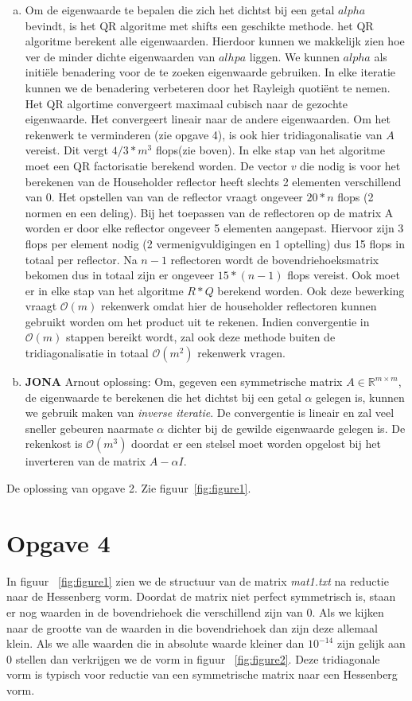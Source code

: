 \documentclass[a4paper]{article}
\newcommand{\opgave}[1]{\section*{Opgave #1}}
\begin{document}
\begin{enumerate}[a)]
\item
Om de eigenwaarde te bepalen die zich het dichtst bij een getal $alpha$ bevindt, is het QR algoritme met shifts een geschikte methode. het QR algoritme berekent alle eigenwaarden. Hierdoor kunnen we makkelijk zien hoe ver de minder dichte eigenwaarden van $alhpa$ liggen. We kunnen $alpha$ als initi\"ele benadering voor de te zoeken eigenwaarde gebruiken. In elke iteratie kunnen we de benadering verbeteren door het Rayleigh quoti\"ent te nemen. Het QR algortime convergeert maximaal cubisch naar de gezochte eigenwaarde. Het convergeert lineair naar de andere eigenwaarden. Om het rekenwerk te verminderen (zie opgave 4), is ook hier tridiagonalisatie van $A$ vereist. Dit vergt $4/3*m^3$ flops(zie boven). In elke stap van het algoritme moet een QR factorisatie berekend worden. De vector $v$ die nodig is voor het berekenen van de Householder reflector heeft slechts 2 elementen verschillend van 0. Het opstellen van van de reflector vraagt ongeveer $20*n$ flops (2 normen en een deling). Bij het toepassen van de reflectoren op de matrix A worden er door elke reflector ongeveer 5 elementen aangepast. Hiervoor zijn 3 flops per element nodig (2 vermenigvuldigingen en 1 optelling) dus 15 flops in totaal per reflector. Na $n-1$ reflectoren wordt de bovendriehoeksmatrix bekomen dus in totaal zijn er ongeveer $15*(n-1)$ flops vereist. Ook moet er in elke stap van het algoritme $R*Q$ berekend worden. Ook deze bewerking vraagt $\mathcal{O} (m)$ rekenwerk omdat hier de householder reflectoren kunnen gebruikt worden om het product uit te rekenen. Indien convergentie in $\mathcal{O} (m)$ stappen bereikt wordt, zal ook deze methode buiten de tridiagonalisatie in totaal $\mathcal{O} (m^2)$ rekenwerk vragen. 

\item \textbf{JONA} Arnout oplossing: Om, gegeven een symmetrische matrix $A \in \mathbb{R}^{m\times m}$, de eigenwaarde te berekenen die het dichtst bij een getal $\alpha$ gelegen is, kunnen we gebruik maken van \textit{inverse iteratie}. De convergentie is lineair en zal veel sneller gebeuren naarmate $\alpha$ dichter bij de gewilde eigenwaarde gelegen is. De rekenkost is $\mathcal{O} (m^3)$ doordat er een stelsel moet worden opgelost bij het inverteren van de matrix $A-\alpha I$.
\end{enumerate}
De oplossing van opgave 2. Zie figuur~\ref{fig:figure1}.
\opgave{4}
In figuur ~\ref{fig:figure1} zien we de structuur van de matrix \textit{mat1.txt} na reductie naar de Hessenberg vorm. Doordat de matrix niet perfect symmetrisch is, staan er nog waarden in de bovendriehoek die verschillend zijn van 0. Als we kijken naar de grootte van de waarden in die bovendriehoek dan zijn deze allemaal klein. Als we alle waarden die in absolute waarde kleiner dan $10^{-14}$ zijn gelijk aan 0 stellen dan verkrijgen we de vorm in figuur ~\ref{fig:figure2}. Deze tridiagonale vorm is typisch voor reductie van een symmetrische matrix naar een Hessenberg vorm.
\end{document}
